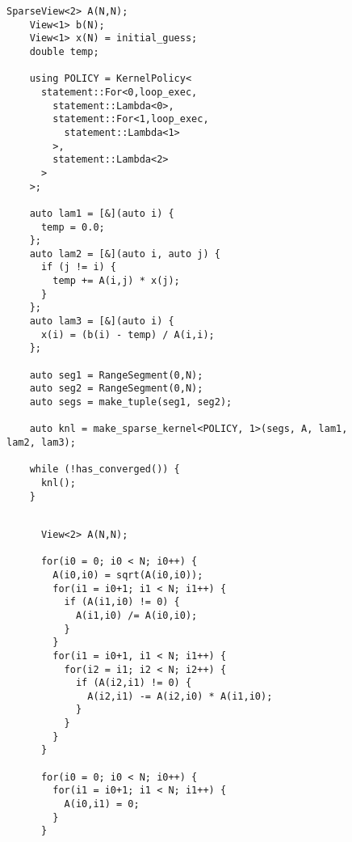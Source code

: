     
    \begin{figure}
    \begin{lstlisting}[caption={\sparseraja{} version of Gauss-Seidel iteration},label=SparseRAJAGauSei]
    SparseView<2> A(N,N);
    View<1> b(N);
    View<1> x(N) = initial_guess;
    double temp;
    
    using POLICY = KernelPolicy<
      statement::For<0,loop_exec,
        statement::Lambda<0>,
        statement::For<1,loop_exec,
          statement::Lambda<1>
        >,
        statement::Lambda<2>
      >
    >;
    
    auto lam1 = [&](auto i) {
      temp = 0.0;
    };
    auto lam2 = [&](auto i, auto j) {
      if (j != i) {
        temp += A(i,j) * x(j);
      }
    };
    auto lam3 = [&](auto i) {
      x(i) = (b(i) - temp) / A(i,i);
    };
    
    auto seg1 = RangeSegment(0,N);
    auto seg2 = RangeSegment(0,N);
    auto segs = make_tuple(seg1, seg2);
    
    auto knl = make_sparse_kernel<POLICY, 1>(segs, A, lam1, lam2, lam3);
    
    while (!has_converged()) {
      knl();
    }
    \end{lstlisting}
    \end{figure}

    \begin{figure}
      \begin{lstlisting}[caption={C++ reference implementation of incomplete Cholesky factorization.},label=CppInCholFact]
      
      View<2> A(N,N);   
      
      for(i0 = 0; i0 < N; i0++) {
        A(i0,i0) = sqrt(A(i0,i0));
        for(i1 = i0+1; i1 < N; i1++) {
          if (A(i1,i0) != 0) {
            A(i1,i0) /= A(i0,i0);
          }
        }
        for(i1 = i0+1, i1 < N; i1++) {
          for(i2 = i1; i2 < N; i2++) {
            if (A(i2,i1) != 0) {
              A(i2,i1) -= A(i2,i0) * A(i1,i0);
            }
          }
        }
      }
      
      for(i0 = 0; i0 < N; i0++) {
        for(i1 = i0+1; i1 < N; i1++) {
          A(i0,i1) = 0;
        }
      }
      \end{lstlisting}
      \end{figure}